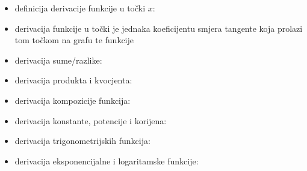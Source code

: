 \documentclass[10pt,oneside,a4paper]{report}
\begin{document}
\noindent
{}
\begin{itemize}
\item definicija derivacije funkcije u to\v{c}ki $x$:\hspace{1cm}
\item derivacija funkcije u to\v{c}ki je jednaka koeficijentu smjera tangente koja prolazi tom to\v{c}kom na grafu te funkcije
\item derivacija sume/razlike: \hspace{1cm}
\item derivacija produkta i kvocjenta:\\
\hspace*{1cm} 
\hspace{1cm}
\hspace{1cm}
\item derivacija kompozicije funkcija: \hspace{1cm}
\item derivacija konstante, potencije i korijena: 
\hspace{1cm} 
\hspace{1cm} 
\item derivacija trigonometrijskih funkcija:\\
\hspace*{1.5cm}
\hspace{0.5cm}
\hspace{0.5cm}
\hspace{0.5cm}
\item derivacija eksponencijalne i logaritamske funkcije:\\
\hspace*{1cm} 
\hspace{2cm} \\
\hspace*{2cm} 
\hspace{2cm} 
\end{itemize}
\end{document}
